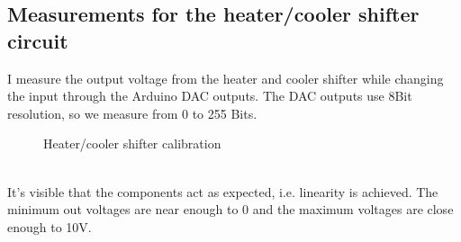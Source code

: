 \documentclass[12pt]{scrartcl}
\begin{document}
      \subsection{Measurements for the heater/cooler shifter circuit}
        I measure the output voltage from the heater and cooler shifter while
        changing the input through the Arduino DAC outputs. The DAC outputs use
        8Bit resolution, so we measure from 0 to 255 Bits.
        \begin{figure}[h]
          \caption{Heater/cooler shifter calibration}
          \label{fig8}
        \end{figure}
        \\It's visible that the components act as expected, i.e. linearity is
        achieved. The minimum out voltages are near enough to 0 and the maximum
        voltages are close enough to 10V.
\end{document}
